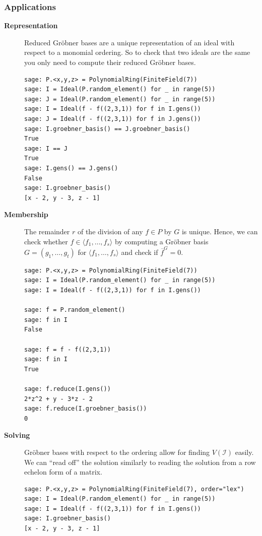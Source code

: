 \documentclass[9pt]{beamer}
\newcommand{\memph}[1]{{\color{yellow9}{\bf #1}}\xspace}
\newcommand{\I}{\ensuremath{\mathcal{I}}\xspace}
\newcommand{\ideal}[1]{\ensuremath{\langle #1\rangle}\xspace}
\begin{document}
\begin{frame}
\frametitle{Applications}
\begin{description}
 \item[\bf Representation] Reduced Gröbner bases are a unique representation of an ideal with respect to a monomial ordering. So to check that two ideals are the same you only need to compute their reduced Gröbner bases.

\begin{lstlisting}
sage: P.<x,y,z> = PolynomialRing(FiniteField(7))
sage: I = Ideal(P.random_element() for _ in range(5))
sage: J = Ideal(P.random_element() for _ in range(5))
sage: I = Ideal(f - f((2,3,1)) for f in I.gens())
sage: J = Ideal(f - f((2,3,1)) for f in J.gens())
sage: I.groebner_basis() == J.groebner_basis()
True
sage: I == J
True
sage: I.gens() == J.gens()
False 
sage: I.groebner_basis()
[x - 2, y - 3, z - 1]
\end{lstlisting}

\framebreak

 \item[\bf Membership] The remainder $r$ of the division of any $f \in P$ by $G$ is unique. Hence, we can check whether $f \in \ideal{f_1,\dots,f_s}$ by computing a Gröbner basis $G = (g_1,\dots,g_t)$ for $\ideal{f_1,\dots,f_s}$ and check if $\overline{f}^G = 0$.

\begin{lstlisting}
sage: P.<x,y,z> = PolynomialRing(FiniteField(7))
sage: I = Ideal(P.random_element() for _ in range(5))
sage: I = Ideal(f - f((2,3,1)) for f in I.gens())

sage: f = P.random_element()
sage: f in I
False

sage: f = f - f((2,3,1))
sage: f in I
True

sage: f.reduce(I.gens())
2*z^2 + y - 3*z - 2
sage: f.reduce(I.groebner_basis())
0
\end{lstlisting}

\framebreak

\item[\bf Solving] Gröbner bases with respect to the \memph{lex} ordering allow for finding $V(\I)$ easily. We can ``read off'' the solution similarly to reading the solution from a row echelon form of a matrix.

\begin{lstlisting}
sage: P.<x,y,z> = PolynomialRing(FiniteField(7), order="lex")
sage: I = Ideal(P.random_element() for _ in range(5))
sage: I = Ideal(f - f((2,3,1)) for f in I.gens())
sage: I.groebner_basis()
[x - 2, y - 3, z - 1]
\end{lstlisting}

\end{description}

\end{frame}
\end{document}
